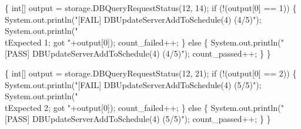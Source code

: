 \documentclass{article}
\def\nwendcode{\endtrivlist \endgroup}
\let\nwdocspar=\par
\begin{document}
\{
  int[] output = storage.DBQueryRequestStatus(12, 14);
  if (!(output[0] == 1)) \{
    System.out.println("[FAIL] DBUpdateServerAddToSchedule(4) (4/5)");
    System.out.println("\\tExpected 1; got "+output[0]);
    count_failed++;
  \} else \{
    System.out.println("[PASS] DBUpdateServerAddToSchedule(4) (4/5)");
    count_passed++;
  \}
\}
\nwendcode{}\nwdocspar
\nwenddocs{}\endmoddef{}
\{
  int[] output = storage.DBQueryRequestStatus(12, 21);
  if (!(output[0] == 2)) \{
    System.out.println("[FAIL] DBUpdateServerAddToSchedule(4) (5/5)");
    System.out.println("\\tExpected 2; got "+output[0]);
    count_failed++;
  \} else \{
    System.out.println("[PASS] DBUpdateServerAddToSchedule(4) (5/5)");
    count_passed++;
  \}
\}
\nwendcode{}\nwdocspar
\end{document}
